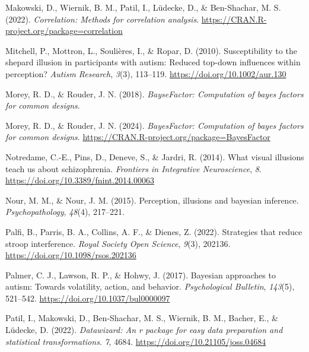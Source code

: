 \documentclass[
  man,
  floatsintext,
  longtable,
  nolmodern,
  notxfonts,
  notimes,
  colorlinks=true,linkcolor=blue,citecolor=blue,urlcolor=blue]{apa7}
\newlength{\cslhangindent}
\newenvironment{CSLReferences}[2] %
 {\begin{list}{}{%
  \setlength{\itemindent}{0pt}
  \setlength{\leftmargin}{0pt}
  \setlength{\parsep}{0pt}
  \ifodd #1
   \setlength{\leftmargin}{\cslhangindent}
   \setlength{\itemindent}{-1\cslhangindent}
  \fi
  \setlength{\itemsep}{#2\baselineskip}}}
 {\end{list}}
\begin{document}
\begin{CSLReferences}{1}{0}
Makowski, D., Wiernik, B. M., Patil, I., Lüdecke, D., \& Ben-Shachar, M.
S. (2022).
\emph{{\textbraceleft}{\textbraceleft}Correlation{\textbraceright}{\textbraceright}:
Methods for correlation analysis}.
\url{https://CRAN.R-project.org/package=correlation}

Mitchell, P., Mottron, L., Soulières, I., \& Ropar, D. (2010).
Susceptibility to the shepard illusion in participants with autism:
Reduced top{-}down influences within perception? \emph{Autism Research},
\emph{3}(3), 113--119. \url{https://doi.org/10.1002/aur.130}

Morey, R. D., \& Rouder, J. N. (2018). \emph{BayseFactor: Computation of
bayes factors for common designs}.

Morey, R. D., \& Rouder, J. N. (2024). \emph{BayesFactor: Computation of
bayes factors for common designs}.
\url{https://CRAN.R-project.org/package=BayesFactor}

Notredame, C.-E., Pins, D., Deneve, S., \& Jardri, R. (2014). What
visual illusions teach us about schizophrenia. \emph{Frontiers in
Integrative Neuroscience}, \emph{8}.
\url{https://doi.org/10.3389/fnint.2014.00063}

Nour, M. M., \& Nour, J. M. (2015). Perception, illusions and bayesian
inference. \emph{Psychopathology}, \emph{48}(4), 217--221.

Palfi, B., Parris, B. A., Collins, A. F., \& Dienes, Z. (2022).
Strategies that reduce stroop interference. \emph{Royal Society Open
Science}, \emph{9}(3), 202136. \url{https://doi.org/10.1098/rsos.202136}

Palmer, C. J., Lawson, R. P., \& Hohwy, J. (2017). Bayesian approaches
to autism: Towards volatility, action, and behavior. \emph{Psychological
Bulletin}, \emph{143}(5), 521--542.
\url{https://doi.org/10.1037/bul0000097}

Patil, I., Makowski, D., Ben-Shachar, M. S., Wiernik, B. M., Bacher, E.,
\& Lüdecke, D. (2022).
\emph{{\textbraceleft}Datawizard{\textbraceright}: An
{\textbraceleft}r{\textbraceright} package for easy data preparation and
statistical transformations}. \emph{7}, 4684.
\url{https://doi.org/10.21105/joss.04684}


\end{CSLReferences}
\end{document}
